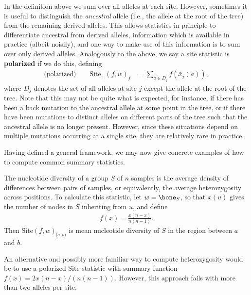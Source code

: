 \documentclass{article}
\newcommand{\site}{\mbox{Site}} %
\newcommand{\sitep}{\mbox{Site}_+} %
\newcommand{\iw}{w} %
\newcommand{\nw}{x} %
\newcommand{\aw}{{\bar x}} %
\begin{document}
In the definition above we sum over all alleles at each site.
However, sometimes it is useful to distinguish the \emph{ancestral} allele
(i.e., the allele at the root of the tree) from the remaining derived alleles.
This allows statistics in principle to differentiate ancestral from derived alleles,
information which is available in practice (albeit noisily),
and one way to make use of this information is to sum over only derived alleles.
Analogously to the above,
we say a site statistic is \textbf{polarized} if we do this,
defining
\begin{align} \label{eqn:site_polarised}
    \text{(polarized)} \qquad
    \sitep(f, \iw)_j
    &=
    \sum_{a \in D_j} f(\aw_j(a)) ,
\end{align}
where $D_j$ denotes the set of all alleles at site $j$ except the allele at the root of the tree.
Note that this may not be quite what is expected,
for instance, if there has been a back mutation to the ancestral allele at some point in the tree,
or if there have been mutations to distinct alleles on different parts of the tree
such that the ancestral allele is no longer present.
However, since these situations depend on multiple mutations occurring at a single site,
they are relatively rare in practice.

Having defined a general framework, we may now give concrete examples
of how to compute common summary statistics.

\begin{example} \label{ex:site_diversity}
    The nucleotide diversity of a group $S$ of $n$ samples
    is the average density of differences between pairs of samples,
    or equivalently, the average heterozygosity across positions.
    To calculate this statistic,
    let $\iw = \bone_S$,
    so that $\nw(u)$ gives the number of nodes in $S$ inheriting from $u$,
    and define
    \begin{align*}
        f(x) = \frac{x (n - x)}{n (n-1)} .
    \end{align*}
    Then $\site(f, \iw)_{[a,b)}$ is mean nucleotide diversity of $S$ in the region between $a$ and $b$.
\end{example}

An alternative and possibly more familiar way to compute heterozygosity
would be to use a polarized Site statistic with summary function $f(x) = 2
x(n-x)/\left(n(n-1)\right)$.
However, this approach fails with more than two alleles per site.
\end{document}

